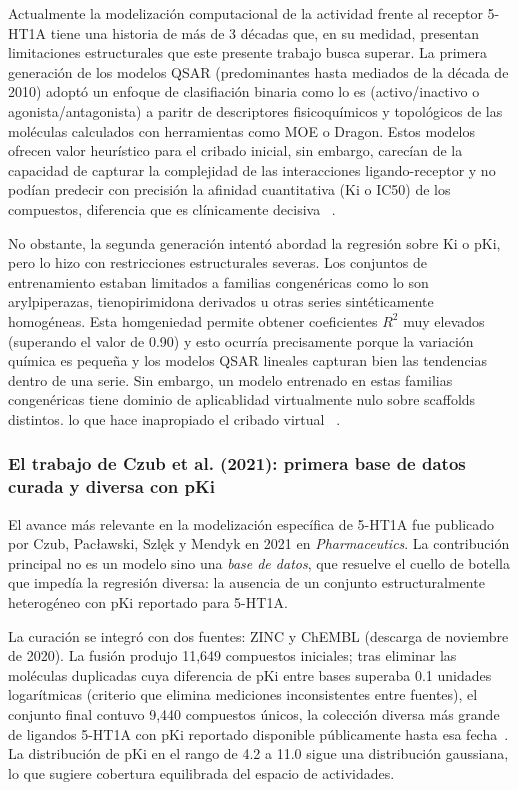 Actualmente la modelización computacional de la actividad frente al receptor 5-HT1A tiene una historia de más de 3 décadas que, en su medidad, presentan limitaciones estructurales que este presente trabajo busca superar. La primera generación de los modelos QSAR (predominantes hasta mediados de la década de 2010) adoptó un enfoque de clasifiación binaria como lo es (activo/inactivo o agonista/antagonista) a paritr de descriptores fisicoquímicos y topológicos de las moléculas calculados con herramientas como MOE o Dragon. Estos modelos ofrecen valor heurístico para el cribado inicial, sin embargo,  carecían de la capacidad de capturar la complejidad de las interacciones ligando-receptor y no podían predecir con precisión la afinidad cuantitativa (Ki o IC50) de los compuestos, diferencia que es clínicamente decisiva ~\cite{czub_curated_2021}.

No obstante, la segunda generación intentó abordad la regresión sobre Ki o pKi, pero lo hizo con restricciones estructurales severas. Los conjuntos de entrenamiento estaban limitados a familias congenéricas como lo son arylpiperazas, tienopirimidona derivados u otras series sintéticamente homogéneas. Esta homgeniedad permite obtener coeficientes $R^2$ muy elevados (superando el valor de 0.90) y esto ocurría precisamente porque la variación química es pequeña y los modelos QSAR lineales capturan bien las tendencias dentro de una serie. Sin embargo, un modelo entrenado en estas familias congenéricas tiene dominio de aplicablidad virtualmente nulo sobre scaffolds distintos. lo que hace inapropiado el cribado virtual ~\cite{czub_curated_2021}.

\subsubsection{El trabajo de Czub et al. (2021): primera base de datos curada y diversa con pKi}

El avance más relevante en la modelización específica de 5-HT1A fue publicado por Czub, Pacławski, Szlęk y Mendyk en 2021 en \textit{Pharmaceutics}. La  contribución principal no es un modelo sino una \emph{base de datos}, que resuelve el cuello de botella que impedía la regresión diversa: la ausencia de un conjunto estructuralmente heterogéneo con pKi reportado para 5-HT1A.
 
La curación se integró con dos fuentes: ZINC y ChEMBL (descarga de noviembre
de 2020). La fusión produjo 11,649 compuestos iniciales; tras eliminar las moléculas duplicadas cuya diferencia de pKi entre bases superaba 0.1 unidades logarítmicas (criterio que elimina mediciones inconsistentes entre fuentes), el conjunto final contuvo 9,440 compuestos únicos, la colección diversa más grande de ligandos 5-HT1A con pKi reportado disponible públicamente hasta esa fecha~\cite{czub_curated_2021}. La distribución de pKi en el rango de 4.2 a 11.0 sigue una distribución gaussiana, lo que sugiere cobertura equilibrada del espacio de actividades.

